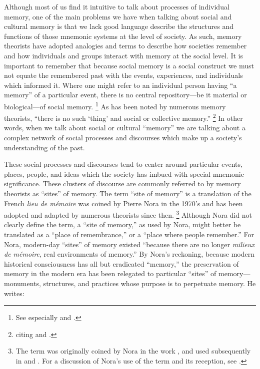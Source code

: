 Although most of us find it intuitive to talk about processes of individual memory, one of the main problems we have when talking about social and cultural memory is that we lack good language describe the structures and functions of those mnemonic systems at the level of society. As such, memory theorists have adopted analogies and terms to describe how societies remember and how individuals and groups interact with memory at the social level. It is important to remember that because social memory is a social construct we must not equate the remembered past with the events, experiences, and individuals which informed it. Where one might refer to an individual person having ``a memory'' of a particular event, there is no central repository---be it material or biological---of social memory.%
    \footnote{See especially \cite{brockmeier_cp2010} and \cite{wertsch_cp2011}.}  
As has been noted by numerous memory theorists, ``there is no such `thing' and social or collective memory.''%
    \footnote{\Cite[14]{wilson2017} citing \cite[112]{olick-robbins_ars1998} and \cite[118--24]{wertsch_boyer-wertsch2009}.}
In other words, when we talk about social or cultural ``memory'' we are talking about a complex network of social processes and discourses which make up a society's understanding of the past.

These social processes and discourses tend to center around particular events, places, people, and ideas which the society has imbued with special mnemonic significance. These clusters of discourse are commonly referred to by memory theorists as ``sites'' of memory. The term ``site of memory'' is a translation of the French \emph{lieu de mémoire} was coined by Pierre Nora in the 1970's and has been adopted and adapted by numerous theorists since then.%
    \footnote{%
        The term was originally coined by Nora in the work
        \cite*{nora_goff-etal1978}, and used subsequently in 
        \cite*{nora1984} and 
        \cite*{nora_representations1989}. For a discussion of Nora's use of the term and its reception, see 
        \cite{szpociński_teksty-drugie2016}.}
Although Nora did not clearly define the term, a ``site of memory,'' as used by Nora, might better be translated as a ``place of remembrance,'' or a ``place where people remember.'' For Nora, modern-day ``sites'' of memory existed ``because there are no longer \emph{milieux de mémoire}, real environments of memory.''%
    \autocite[7]{nora_representations1989}
By Nora's reckoning, because modern historical consciousness has all but eradicated ``memory,'' the preservation of memory in the modern era has been relegated to particular ``sites'' of memory---monuments, structures, and practices whose purpose is to perpetuate memory. He writes:

